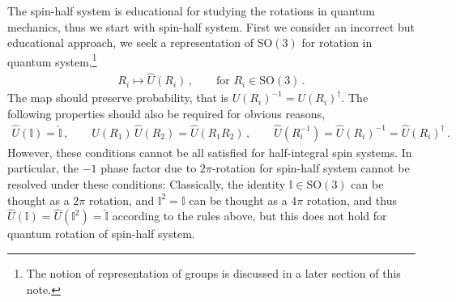 \documentclass[11pt, onesided]{book}
\theoremstyle{break}
\theoremstyle{break}
\begin{document}
The spin-half system is educational for studying the rotations in quantum mechanics, thus we start with spin-half system. First we consider an incorrect but educational approach, we seek a representation of SO$(3)$ for rotation in quantum system,\footnote{The notion of representation of groups is discussed in a later section of this note.}
\begin{align*}
R_i \mapsto \hat{U}(R_i)\,,\qquad\text{for }R_i \in \text{SO}(3)\,.
\end{align*}
The map should preserve probability, that is $U(R_i)^{-1} = U(R_i)^\dagger$. The following properties should also be required for obvious reasons, 
\begin{align*}
\hat{U}(\mathbb{I}) =\hat{ \mathbb{I}}\,,\qquad
\hat{U}(R_{1}) \, \hat{U}(R_2) = \hat{U}(R_1R_2)\,,\qquad
\hat{U}(R_i^{-1}) = \hat{U}(R_i)^{-1} = \hat{U}(R_i)^\dagger\,.
\end{align*}
However, these conditions cannot be all satisfied for half-integral spin systems. In particular, the $-1$ phase factor due to $2\pi$-rotation for spin-half system cannot be resolved under these conditions: Classically, the identity $\mathbb{I}\in \text{SO}(3)$ can be thought as a $2\pi$ rotation, and $\mathbb{I}^2 =\mathbb{I}$ can be thought as a $4\pi$ rotation, and thus $\hat{U}(\mathbb{I}) = \hat{U}(\mathbb{I}^2) = \hat{\mathbb{I}}$ according to the rules above, but this does not hold for quantum rotation of spin-half system. \\
\end{document}
